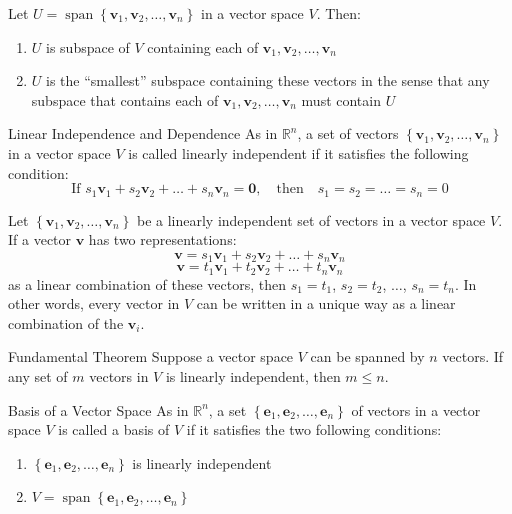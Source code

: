 \documentclass[12pt]{article}
\begin{document}
\begin{theorem}{}{}
    Let $ U = \operatorname{span} \left\{ \mathbf{v}_1, \mathbf{v}_2, \dots, \mathbf{v}_n \right\} $ in a vector space $ V $. Then:
    \begin{enumerate}[label=(\roman*)]
        \item $ U $ is subspace of $ V $ containing each of $ \mathbf{v}_1, \mathbf{v}_2, \dots, \mathbf{v}_n $
        \item $ U $ is the ``smallest'' subspace containing these vectors in the sense that any subspace that contains each of $ \mathbf{v}_1, \mathbf{v}_2, \dots, \mathbf{v}_n $ must contain $ U $
    \end{enumerate}
\end{theorem}

\begin{theorem}{Linear Independence and Dependence}{}
    As in $ \mathbb{R}^n $, a set of vectors $ \left\{ \mathbf{v}_1, \mathbf{v}_2, \dots, \mathbf{v}_n \right\} $ in a vector space $ V $ is called linearly independent if it satisfies the following condition:
    \[ \text{If } s_1 \mathbf{v}_1 + s_2 \mathbf{v}_2 + \dots + s_n \mathbf{v}_n = \mathbf{0}, \quad \text{then} \quad s_1 = s_2 = \dots = s_n = 0 \]
\end{theorem}

\begin{theorem}{}{}
    Let $ \left\{ \mathbf{v}_1, \mathbf{v}_2, \dots, \mathbf{v}_n \right\} $ be a linearly independent set of vectors in a vector space $ V $. If a vector $ \mathbf{v} $ has two representations:
    \[ \mathbf{v} = s_1 \mathbf{v}_1 + s_2 \mathbf{v}_2 + \dots + s_n \mathbf{v}_n \]
    \[ \mathbf{v} = t_1 \mathbf{v}_1 + t_2 \mathbf{v}_2 + \dots + t_n \mathbf{v}_n \]
    as a linear combination of these vectors, then $ s_1 = t_1 $, $ s_2 = t_2 $, $ \dots $, $ s_n = t_n $. In other words, every vector in $ V $ can be written in a unique way as a linear combination of the $ \mathbf{v}_i $.
\end{theorem}

\begin{theorem}{Fundamental Theorem}{}
    Suppose a vector space $ V $ can be spanned by $ n $ vectors. If any set of $ m $ vectors in $ V $ is linearly independent, then $ m \leq n $.
\end{theorem}

\begin{definition}{Basis of a Vector Space}{}
    As in $ \mathbb{R}^n $, a set $ \left\{ \mathbf{e}_1, \mathbf{e}_2, \dots, \mathbf{e}_n \right\} $ of vectors in a vector space $ V $ is called a basis of $ V $ if it satisfies the two following conditions:
    \begin{enumerate}[label=(\roman*)]
        \item $ \left\{ \mathbf{e}_1, \mathbf{e}_2, \dots, \mathbf{e}_n \right\} $ is linearly independent
        \item $ V = \operatorname{span} \left\{ \mathbf{e}_1, \mathbf{e}_2, \dots, \mathbf{e}_n \right\} $
    \end{enumerate}
\end{definition}
\end{document}
